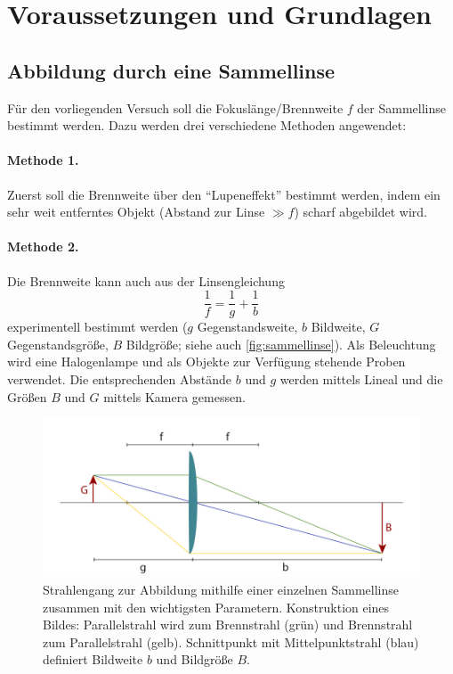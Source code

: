 \documentclass[ngerman]{scrartcl}
\begin{document}
\section[Voraussetzungen und Grundlagen]{Voraussetzungen und Grundlagen \cite{ref:angabe}}
\label{sec:voraussetzungen_grundlagen}

\subsection{Abbildung durch eine Sammellinse}
\label{subsec:abbildung_sammellinse_Grundlagen}

Für den vorliegenden Versuch soll die Fokuslänge/Brennweite $f$ der Sammellinse bestimmt werden. Dazu werden drei verschiedene Methoden angewendet:

\paragraph{Methode 1.}
Zuerst soll die Brennweite über den \enquote{Lupeneffekt} bestimmt werden, indem ein sehr weit entferntes Objekt (Abstand zur Linse $\gg f$) scharf abgebildet wird.

\paragraph{Methode 2.}
Die Brennweite kann auch aus der Linsengleichung
%
\begin{equation}
    \label{eq:linsengleichung}
    \frac{1}{f} = \frac{1}{g} + \frac{1}{b}
\end{equation}
%
experimentell bestimmt werden ($g$ Gegenstandsweite, $b$ Bildweite, $G$ Gegenstandsgröße, $B$ Bildgröße; siehe auch \autoref{fig:sammellinse}). Als Beleuchtung wird eine Halogenlampe und als Objekte zur Verfügung
stehende Proben verwendet. Die entsprechenden Abstände $b$ und $g$ werden mittels Lineal und die Größen $B$ und $G$ mittels Kamera gemessen.
%
\begin{figure}[H]
    \centering
    \begin{samepage}
        \includegraphics[width=\linewidth]{fig/Sammellinse.png}
        \caption[Strahlengang einer Sammellinse]{Strahlengang zur Abbildung mithilfe einer einzelnen Sammellinse zusammen mit den wichtigsten Parametern. Konstruktion eines Bildes: Parallelstrahl wird zum Brennstrahl (grün) und Brennstrahl zum Parallelstrahl (gelb). Schnittpunkt mit Mittelpunktstrahl (blau) definiert Bildweite $b$ und Bildgröße $B$.}
        \label{fig:sammellinse}
    \end{samepage}
\end{figure}
\end{document}

